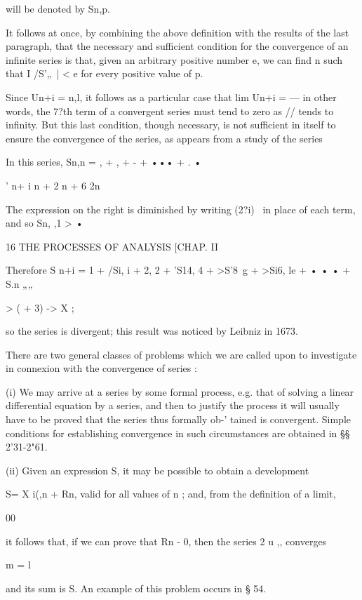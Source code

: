 will be denoted by Sn,p. 

It follows at once, by combining the above definition with the results 
of the last paragraph, that the necessary and sufficient condition for the 
convergence of an infinite series is that, given an arbitrary positive number e, 
we can find n such that I /S'„\   | < e for every positive value of p. 

Since Un+i =  n,l, it follows as a particular case that lim Un+i = — in other 
words, the 7?th term of a convergent series must tend to zero as // tends to 
infinity. But this last condition, though necessary, is not sufficient in itself 
to ensure the convergence of the series, as appears from a study of the series 

In this series, Sn,n =  , +  , + -  + ••• + .  • 

' n+ i n + 2 n + 6 2n 

The expression on the right is diminished by writing (2?i)~  in place of 
each term, and so Sn, ,1 >   • 



16 THE PROCESSES OF ANALYSIS [CHAP. II 

Therefore S n+i = 1 + /Si, i +  2, 2 + 'S14, 4 + >S'8\  g + >Si6, le + • • • + S.n  „„ 

>   (  + 3) -> X ; 

so the series is divergent; this result was noticed by Leibniz in 1673. 

There are two general classes of problems which we are called upon to 
investigate in connexion with the convergence of series : 

(i) We may arrive at a series by some formal process, e.g. that of 
solving a linear differential equation by a series, and then to justify the 
process it will usually have to be proved that the series thus formally ob-' 
tained is convergent. Simple conditions for establishing convergence in 
such circumstances are obtained in §§ 2'31-2"61. 

(ii) Given an expression S, it may be possible to obtain a development 

S= X i(,n + Rn, valid for all values of n ; and, from the definition of a limit, 

00 

it follows that, if we can prove that Rn -  0, then the series 2 u ,, converges 

m = l 

and its sum is  S. An example of this problem occurs in § 54. 

